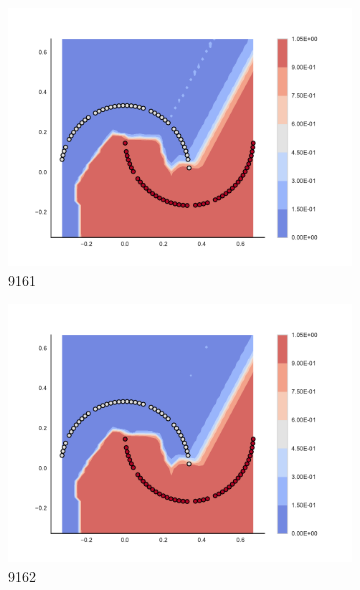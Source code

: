 \begin{figure}[h]
\begin{subfigure}[b]{0.09\textwidth}
    \includegraphics[clip, trim=2.35cm 1.75cm 4.5cm 0cm,width=\textwidth]{img/convergence/9161.pdf}
    \caption{9161}
    \label{fig:convergence_9161}
\end{subfigure}
%
\begin{subfigure}[b]{0.09\textwidth}
    \includegraphics[clip, trim=2.35cm 1.75cm 4.5cm 0cm,width=\textwidth]{img/convergence/9162.pdf}
    \caption{9162}
    \label{fig:convergence_9162}
\end{subfigure}
%
\begin{subfigure}[b]{0.09\textwidth}

\end{subfigure}
\end{figure}
